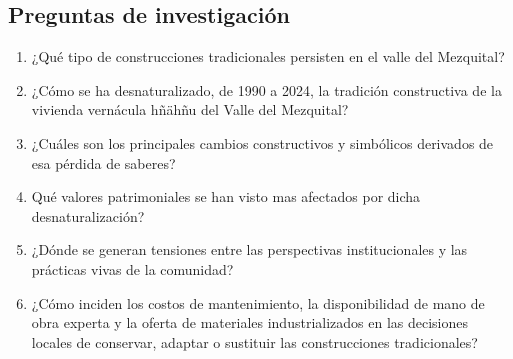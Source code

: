 \subsection{Preguntas de investigación}

\begin{enumerate}

	\item {¿Qué tipo de construcciones tradicionales persisten en el valle del Mezquital?}

	\item {¿Cómo se ha desnaturalizado, de 1990 a 2024, la tradición constructiva de la vivienda vernácula hñähñu del Valle del Mezquital?}

	\item {¿Cuáles son los principales cambios constructivos y simbólicos derivados de esa pérdida de saberes?}

	\item {Qué valores patrimoniales se han visto mas afectados por dicha desnaturalización?}

	\item{¿Dónde se generan tensiones entre las perspectivas institucionales y las prácticas vivas de la comunidad?}

	\item {¿Cómo inciden los costos de mantenimiento, la disponibilidad de mano de obra experta y la oferta de materiales industrializados en las decisiones locales de conservar, adaptar o sustituir las construcciones tradicionales?}

\end{enumerate}
